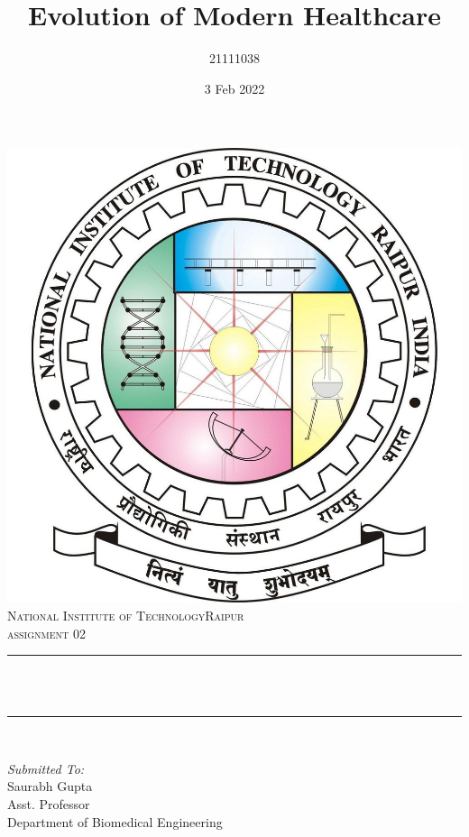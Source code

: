 \documentclass[12pt]{article}
\title{Evolution of Modern Healthcare}								%
\author{21111038}								%
\date{3 Feb 2022}											%
\makeatletter
\let\thetitle\@title
\makeatother
\begin{document}

\begin{titlepage}
	\centering
    \vspace*{0.5 cm}
    \includegraphics[scale = 0.20]{logo.jpg}\\[1.0 cm]	%
    \textsc{\LARGE  National Institute of Technology\newline\newline Raipur}\\[2.0 cm]	%
	\textsc{\Large assignment 02}\\[0.5 cm]				%
	\rule{\linewidth}{0.2 mm} \\[0.4 cm]
	{ \huge \bfseries \thetitle}\\
	\rule{\linewidth}{0.2 mm} \\[1.5 cm]
	
	\begin{minipage}{0.4\textwidth}
		\begin{flushleft} \large
			\emph{Submitted To:}\\
			Saurabh Gupta\\
            Asst. Professor\\
            Department of Biomedical Engineering\\
			\end{flushleft}
			\end{minipage}~
			\begin{minipage}{0.4\textwidth}
            

\end{minipage}
\end{titlepage}
\end{document}
